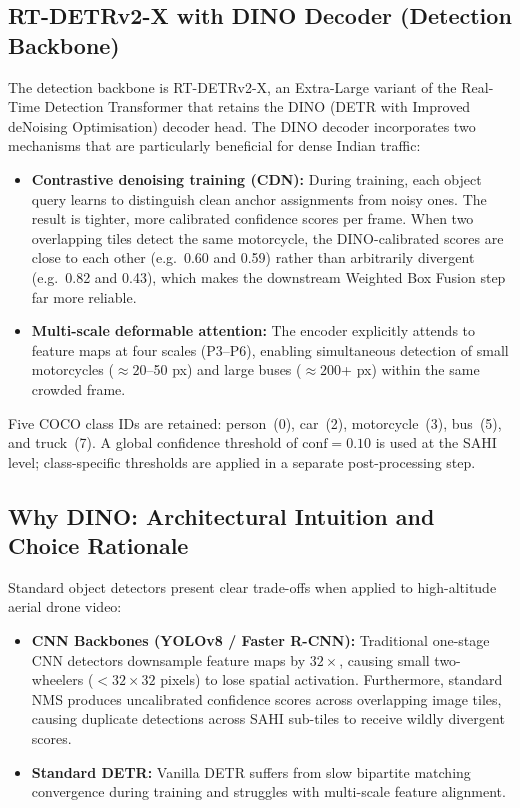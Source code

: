 \documentclass[12pt,a4paper]{report}
\begin{document}
\subsection{RT-DETRv2-X with DINO Decoder (Detection Backbone)}

The detection backbone is RT-DETRv2-X, an Extra-Large variant of the Real-Time Detection
Transformer that retains the DINO (DETR with Improved deNoising Optimisation) decoder head.
The DINO decoder incorporates two mechanisms that are particularly beneficial for dense
Indian traffic:

\begin{itemize}
    \item \textbf{Contrastive denoising training (CDN):}
          During training, each object query learns to distinguish clean anchor assignments
          from noisy ones.  The result is tighter, more calibrated confidence scores
          per frame.  When two overlapping tiles detect the same motorcycle, the
          DINO-calibrated scores are close to each other (e.g.\ 0.60 and 0.59) rather than
          arbitrarily divergent (e.g.\ 0.82 and 0.43), which makes the downstream
          Weighted Box Fusion step far more reliable.

    \item \textbf{Multi-scale deformable attention:}
          The encoder explicitly attends to feature maps at four scales (P3--P6),
          enabling simultaneous detection of small motorcycles ($\approx 20$--50 px) and
          large buses ($\approx 200$+ px) within the same crowded frame.
\end{itemize}

Five COCO class IDs are retained: person~(0), car~(2), motorcycle~(3), bus~(5), and
truck~(7).  A global confidence threshold of $\text{conf} = 0.10$ is used at the SAHI
level; class-specific thresholds are applied in a separate post-processing step.

\subsection{Why DINO: Architectural Intuition and Choice Rationale}

Standard object detectors present clear trade-offs when applied to high-altitude aerial drone video:
\begin{itemize}
    \item \textbf{CNN Backbones (YOLOv8 / Faster R-CNN):} Traditional one-stage CNN detectors downsample feature maps by $32\times$, causing small two-wheelers ($< 32 \times 32$ pixels) to lose spatial activation. Furthermore, standard NMS produces uncalibrated confidence scores across overlapping image tiles, causing duplicate detections across SAHI sub-tiles to receive wildly divergent scores.
    \item \textbf{Standard DETR:} Vanilla DETR suffers from slow bipartite matching convergence during training and struggles with multi-scale feature alignment.
\end{itemize}
\end{document}
